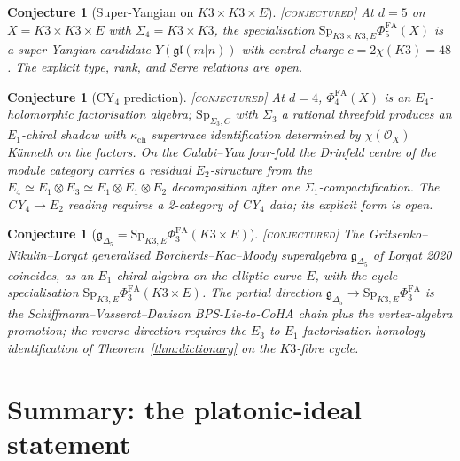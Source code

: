 \documentclass[11pt]{amsart}
\providecommand{\fgl}{\mathfrak{gl}}
\providecommand{\gDelta}{\mathfrak{g}_{\Delta_5}}
\providecommand{\cO}{\mathcal{O}}
\providecommand{\Sp}{\mathrm{Sp}}
\providecommand{\Eone}{E_1}
\providecommand{\Etwo}{E_2}
\providecommand{\Ethree}{E_3}
\providecommand{\kch}{\kappa_{\mathrm{ch}}}
\providecommand{\PhiFA}{\Phi^{\mathrm{FA}}}
\providecommand{\ClaimStatusConjectured}{\textsc{[conjectured]}}
\theoremstyle{plain}
\newtheorem{conjecture}[theorem]{Conjecture}
\theoremstyle{definition}
\theoremstyle{remark}
\begin{document}
\begin{conjecture}[Super-Yangian on $K3\times K3\times E$]
\label{conj:super-yangian}
\ClaimStatusConjectured{}\;
At $d=5$ on $X=K3\times K3\times E$ with $\Sigma_4=K3\times K3$, the
specialisation $\Sp_{K3\times K3,E}\PhiFA_5(X)$ is a super-Yangian
candidate $Y(\fgl(m|n))$ with central charge $c=2\chi(K3)=48$. The
explicit type, rank, and Serre relations are open.
\end{conjecture}

\begin{conjecture}[CY$_4$ prediction]
\label{conj:cy4}
\ClaimStatusConjectured{}\;
At $d=4$, $\PhiFA_4(X)$ is an $E_4$-holomorphic factorisation algebra;
$\Sp_{\Sigma_3,C}$ with $\Sigma_3$ a rational threefold produces an
$\Eone$-chiral shadow with $\kch$ supertrace identification
determined by $\chi(\cO_X)$ K\"unneth on the factors. On the
Calabi--Yau four-fold the Drinfeld centre of the module category
carries a residual $\Etwo$-structure from the
$E_4\simeq\Eone\otimes E_3\simeq\Eone\otimes\Eone\otimes\Etwo$
decomposition after one $\Sigma_1$-compactification. The CY$_4\to\Etwo$
reading requires a 2-category of CY$_4$ data; its explicit form is
open.
\end{conjecture}

\begin{conjecture}[$\gDelta = \Sp_{K3,E}\PhiFA_3(K3\times E)$]
\label{conj:gDelta-equals-sp}
\ClaimStatusConjectured{}\;
The Gritsenko--Nikulin--Lorgat generalised Borcherds--Kac--Moody
superalgebra $\gDelta$ of Lorgat 2020 coincides, as an $\Eone$-chiral
algebra on the elliptic curve $E$, with the cycle-specialisation
$\Sp_{K3,E}\PhiFA_3(K3\times E)$. The partial direction
$\gDelta\to\Sp_{K3,E}\PhiFA_3$ is the Schiffmann--Vasserot--Davison
BPS-Lie-to-CoHA chain plus the vertex-algebra promotion; the reverse
direction requires the $\Ethree$-to-$\Eone$ factorisation-homology
identification of Theorem~\ref{thm:dictionary} on the $K3$-fibre cycle.
\end{conjecture}

\section{Summary: the platonic-ideal statement}
\end{document}
